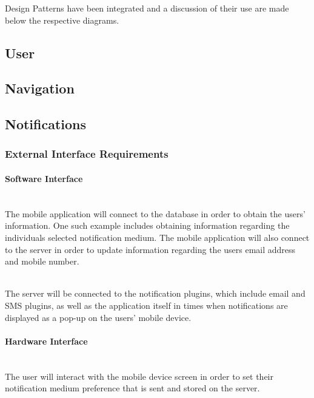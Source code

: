 \documentclass[runningheads,a4paper]{article}
\begin{document}
Design Patterns have been integrated and a discussion of their use are made below the respective diagrams.



\subsection {User}



\subsection {Navigation}



\subsection {Notifications}



\subsubsection{External Interface Requirements}



\paragraph{Software Interface}
\mbox{}\\
The mobile application will connect to the database in order to obtain the users’ information. One such example includes obtaining information regarding the individuals selected notification medium. The mobile application will also connect to the server in order to update information regarding the users email address and mobile number.

\mbox{}\\
The server will be connected to the notification plugins, which include email and SMS plugins, as well as the application itself in times when notifications are displayed as a pop-up on the users’ mobile device.



\paragraph{Hardware Interface}

\mbox{}\\
The user will interact with the mobile device screen in order to set their notification medium preference that is sent and stored on the server. 
\end{document}
